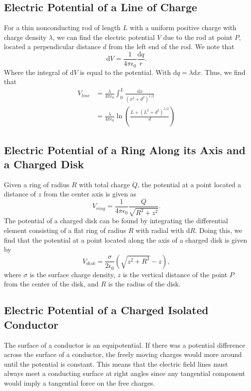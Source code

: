 \documentclass[11pt]{article}
\theoremstyle{plain} %
\theoremstyle{definition}
\theoremstyle{example}
\theoremstyle{remark}
\begin{document}
\subsection{Electric Potential of a Line of Charge}
For a thin nonconducting rod of length $L$ with a uniform positive charge with charge density $\lambda$, we can find the electric potential $V$ due to the rod at point $P$, located a perpendicular distance $d$ from the left end of the rod. We note that $$\mathrm d V = \frac{1}{4\pi\epsilon_0}\frac{\mathrm d q}{r}.$$
Where the integral of $\mathrm d V$ is equal to the potential. With $\mathrm d q = \lambda \mathrm d x$. Thus, we find that 
\begin{align*}
	V_{line} &= \frac{\lambda}{4\pi\epsilon_0}\int_0^L\frac{\mathrm d x}{\left(x^2+d^2\right)^{1/2}}\\
	&=  \frac{\lambda}{4\pi\epsilon_0}\ln\left(\frac{L + \left(L^2+d^2\right)^{1/2}}{d}\right)
\end{align*}

\subsection{Electric Potential of a Ring Along its Axis and a Charged Disk}

Given a ring of radius $R$ with total charge $Q$, the potential at a point located a distance of $z$ from the center axis is given as 
$$V_{ring} = \frac{1}{4\pi\epsilon_0}\frac{Q}{\sqrt{R^2+z^2}}.$$
The potential of a charged disk can be found by integrating the differential element consisting of a flat ring of radius $R$ with radial with $\mathrm d R$. Doing this, we find that the potential at a point located along the axis of a charged disk is given by 
$$V_{disk}=\frac{\sigma}{2\epsilon_0}\left(\sqrt{z^2+R^2}-z\right),$$
where $\sigma$ is the surface charge density, $z$ is the vertical distance of the point $P$ from the center of the disk, and $R$ is the radius of the disk. 

\subsection{Electric Potential of a Charged Isolated Conductor}

The surface of a conductor is an equipotential. If there was a potential difference across the surface of a conductor, the freely moving charges would more around until the potential is constant. This means that the electric field lines must always meet a conducting surface at right angles since any tangential component would imply a tangential force on the free charges. 
\end{document}
